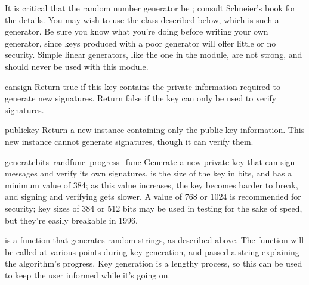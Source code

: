 It is critical that the random number generator be
; consult Schneier's book for the
details.  You may wish to use the  class described
below, which is such a generator.  Be sure you know what you're doing
before writing your own generator, since keys produced with a poor
generator will offer little or no security.  Simple linear generators,
like the one in the
 module, are not strong, and should never be used with
this module.

\begin{funcdesc}{cansign}{}
Return true if this key contains the private information required to
generate new signatures.  Return false if the key can only be used to
verify signatures.
\end{funcdesc}

\begin{funcdesc}{publickey}{}
Return a new  instance containing only the public key
information.  This new instance cannot generate signatures, though it
can verify them.
\end{funcdesc}

\begin{funcdesc}{generate}{bits\, randfunc\, progress_func}
Generate a new private key that can sign messages and verify its own
signatures.   is the size of the key in bits, and has a
minimum value of 384; as this value increases, the key becomes harder
to break, and signing and verifying gets slower.  A value of 768 or
1024 is recommended for security; key sizes of 384 or 512 bits may be
used in testing for the sake of speed, but they're easily breakable in
1996.

 is a function that generates random strings, as described above.
The function  will be called at various points
during key generation, and passed a string explaining the algorithm's
progress.  Key generation is a lengthy process, so this can be used
to keep the user informed while it's going on.
\end{funcdesc}

